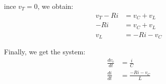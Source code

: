 \documentclass[preview]{standalone}
\begin{document}
\begin{center}
ince $v_T = 0$, we obtain: 
                    \begin{align*}
                        v_T - Ri &= v_C + v_L \\
                        - Ri &= v_C + v_L \\
                        v_L &= -Ri - v_C
                    \end{align*}

                    Finally, we get the system: 
                    \begin{align*}
                        \frac{dv_c}{dt} &= \frac{i}{C} \\
                        \frac{di}{dt} &= \frac{-Ri - v_C}{L}
                    \end{align*}
\end{center}
\end{document}
